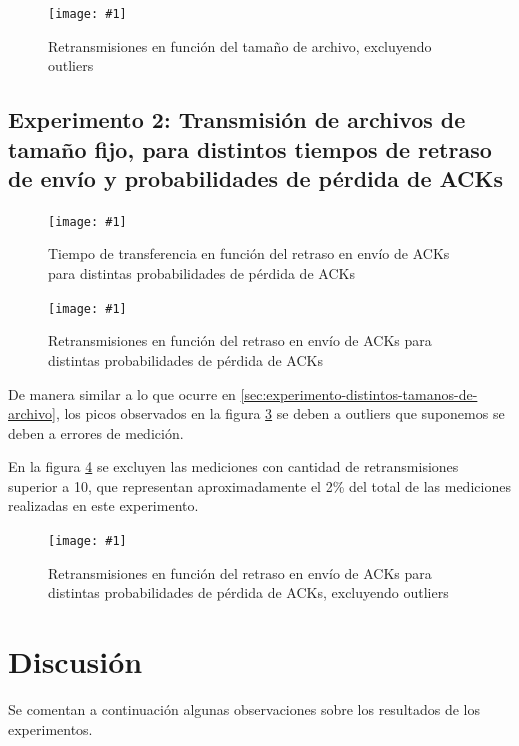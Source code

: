 \documentclass[a4paper, 10pt, twoside]{article}
\newcommand{\grafico}[3]{
  \begin{figure}[H]
    \texttt{[image: \#1]}
    \caption{#2}
    \label{#3}
  \end{figure}
}
\begin{document}
\grafico{retransmissions_vs_size_wo_outliers}
        {Retransmisiones en función del tamaño de archivo, excluyendo outliers}
        {plot:retransmissions_vs_size_wo_outliers}


\subsection{Experimento 2: Transmisión de archivos de tamaño fijo, para distintos tiempos de retraso de envío y probabilidades de pérdida de ACKs}

\grafico{time_vs_delay_and_loss_probability}
        {Tiempo de transferencia en función del retraso en envío de ACKs para distintas probabilidades de pérdida de ACKs}
        {plot:time_vs_delay_and_loss_probability}

\grafico{retransmissions_vs_delay_and_loss_probability}
        {Retransmisiones en función del retraso en envío de ACKs para distintas probabilidades de pérdida de ACKs}
        {plot:retransmissions_vs_delay_and_loss_probability}

De manera similar a lo que ocurre en \ref{sec:experimento-distintos-tamanos-de-archivo}, los picos observados en la figura \ref{plot:retransmissions_vs_delay_and_loss_probability} se deben a outliers que suponemos se deben a errores de medición.

En la figura \ref{plot:retransmissions_vs_delay_and_loss_probability_wo_outliers} se excluyen las mediciones con cantidad de retransmisiones superior a 10, que representan aproximadamente el 2\% del total de las mediciones realizadas en este experimento.

\grafico{retransmissions_vs_delay_and_loss_probability_wo_outliers}
        {Retransmisiones en función del retraso en envío de ACKs para distintas probabilidades de pérdida de ACKs, excluyendo outliers}
        {plot:retransmissions_vs_delay_and_loss_probability_wo_outliers}




\section{Discusión}
\label{sec:discusion}

Se comentan a continuación algunas observaciones sobre los resultados de los experimentos.
\end{document}

